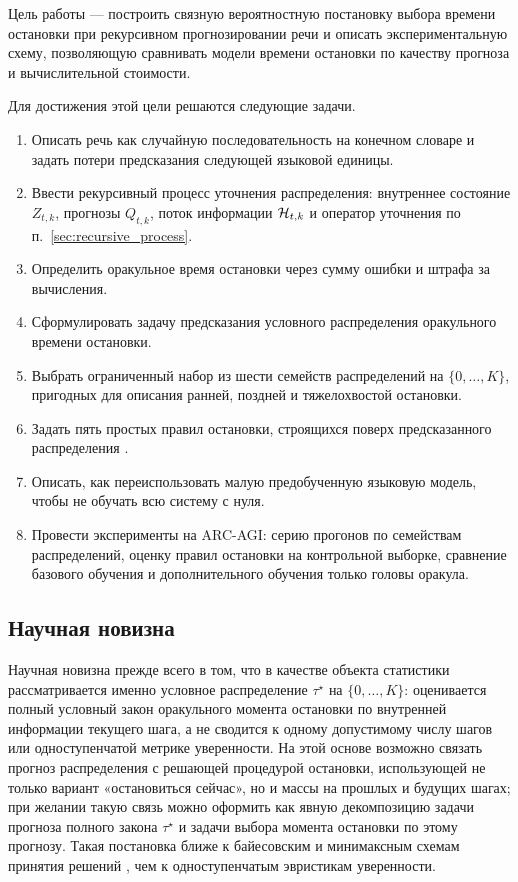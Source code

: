 Цель работы --- построить связную вероятностную постановку выбора времени остановки при
рекурсивном прогнозировании речи и описать экспериментальную схему, позволяющую сравнивать модели
времени остановки по качеству прогноза и вычислительной стоимости.

Для достижения этой цели решаются следующие задачи.
\begin{enumerate}
  \item Описать речь как случайную последовательность на конечном словаре и задать потери
  предсказания следующей языковой единицы.
  \item Ввести рекурсивный процесс уточнения распределения: внутреннее состояние \(Z_{t,k}\),
  прогнозы \(Q_{t,k}\), поток информации \(\mathcal{H}_{t,k}\) и оператор уточнения по
  п.~\ref{sec:recursive_process}.
  \item Определить оракульное время остановки через сумму ошибки и штрафа за вычисления.
  \item Сформулировать задачу предсказания условного распределения оракульного времени остановки.
  \item Выбрать ограниченный набор из шести семейств распределений на \(\{0,\ldots,K\}\),
  пригодных для описания ранней, поздней и тяжелохвостой остановки.
  \item Задать пять простых правил остановки, строящихся поверх предсказанного распределения
  \cite{ferguson1967,bishop2006}.
  \item Описать, как переиспользовать малую предобученную языковую модель, чтобы не обучать всю
  систему с нуля.
  \item Провести эксперименты на ARC-AGI: серию прогонов по семействам распределений, оценку
  правил остановки на контрольной выборке, сравнение базового обучения и дополнительного обучения
  только головы оракула.
\end{enumerate}

\subsection{Научная новизна}

Научная новизна прежде всего в том, что в качестве объекта статистики рассматривается именно
условное распределение \(\tau^\star\) на \(\{0,\ldots,K\}\): оценивается полный условный закон
оракульного момента остановки по внутренней информации текущего шага, а не сводится к одному
допустимому числу шагов или одноступенчатой метрике уверенности. На этой основе возможно связать
прогноз распределения с решающей процедурой остановки, использующей не только вариант
«остановиться сейчас», но и массы на прошлых и будущих шагах; при желании такую связь можно
оформить как явную декомпозицию задачи прогноза полного закона \(\tau^\star\) и задачи выбора
момента остановки по этому прогнозу. Такая постановка ближе к байесовским и минимаксным схемам
принятия решений \cite{ferguson1967}, чем к одноступенчатым эвристикам уверенности.

